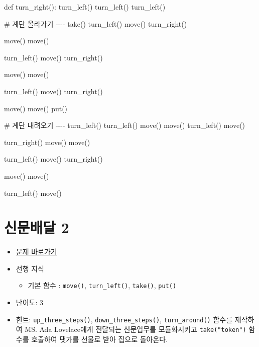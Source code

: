 \documentclass[
  b5paperpaper,
  DIV=11,
  numbers=noendperiod]{scrreprt}
\newenvironment{Shaded}{\begin{snugshade}}{\end{snugshade}}
\newcommand{\CommentTok}[1]{\textcolor[rgb]{0.37,0.37,0.37}{#1}}
\newcommand{\KeywordTok}[1]{\textcolor[rgb]{0.00,0.23,0.31}{#1}}
\newcommand{\NormalTok}[1]{\textcolor[rgb]{0.00,0.23,0.31}{#1}}
\providecommand{\tightlist}{%
  \setlength{\itemsep}{0pt}\setlength{\parskip}{0pt}}\usepackage{longtable,booktabs,array}
\begin{document}
\begin{Shaded}
\begin{Highlighting}[]
\KeywordTok{def}\NormalTok{ turn\_right():}
\NormalTok{    turn\_left()}
\NormalTok{    turn\_left()}
\NormalTok{    turn\_left()}

\CommentTok{\# 계단 올라가기 {-}{-}{-}{-}    }
\NormalTok{take()}
\NormalTok{turn\_left()}
\NormalTok{move()}
\NormalTok{turn\_right()}

\NormalTok{move()}
\NormalTok{move()}

\NormalTok{turn\_left()}
\NormalTok{move()}
\NormalTok{turn\_right()}

\NormalTok{move()}
\NormalTok{move()}

\NormalTok{turn\_left()}
\NormalTok{move()}
\NormalTok{turn\_right()}

\NormalTok{move()}
\NormalTok{move()}
\NormalTok{put()}

\CommentTok{\# 계단 내려오기 {-}{-}{-}{-}}
\NormalTok{turn\_left()}
\NormalTok{turn\_left()}
\NormalTok{move()}
\NormalTok{move()}
\NormalTok{turn\_left()}
\NormalTok{move()}

\NormalTok{turn\_right()}
\NormalTok{move()}
\NormalTok{move()}

\NormalTok{turn\_left()}
\NormalTok{move()}
\NormalTok{turn\_right()}

\NormalTok{move()}
\NormalTok{move()}

\NormalTok{turn\_left()}
\NormalTok{move()}
\end{Highlighting}
\end{Shaded}

\hypertarget{newspaper-02}{%
\section{신문배달 2}\label{newspaper-02}}

\begin{itemize}
\tightlist
\item
  \href{https://reeborg.ca/reeborg.html?lang=ko-en\&mode=python\&menu=worlds\%2Fmenus\%2Freeborg_intro_en.json\&name=Newspaper\%200\&url=worlds\%2Ftutorial_en\%2Fnewspaper0.json}{문제
  바로가기}
\item
  선행 지식

  \begin{itemize}
  \tightlist
  \item
    기본 함수 : \texttt{move()}, \texttt{turn\_left()}, \texttt{take()},
    \texttt{put()}
  \end{itemize}
\item
  난이도: 3
\item
  힌트: \texttt{up\_three\_steps()}, \texttt{down\_three\_steps()},
  \texttt{turn\_around()} 함수를 제작하여 MS. Ada Lovelace에게 전달되는
  신문업무를 모듈화시키고 \texttt{take("token")} 함수를 호출하여 댓가를
  선물로 받아 집으로 돌아온다.
\end{itemize}
\end{document}
